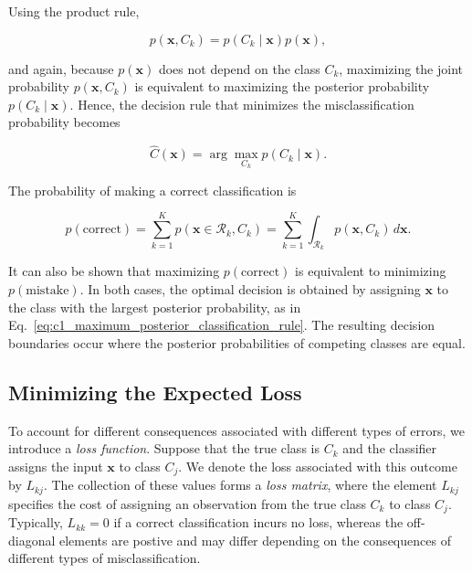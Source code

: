 \documentclass[10pt,twocolumn]{memoir}
\begin{document}
Using the product rule,

\begin{equation}
    p(\mathbf{x},C_k) = p(C_k\mid\mathbf{x})p(\mathbf{x}),
\end{equation}

and again, because $p(\mathbf{x})$ does not depend on the class $C_k$, maximizing the joint probability $p(\mathbf{x},C_k)$ is equivalent to maximizing the posterior probability $p(C_k\mid\mathbf{x})$. Hence, the decision rule that minimizes the misclassification probability becomes

\begin{equation}
    \hat{C}(\mathbf{x}) = \arg\max_{C_k} p(C_k\mid\mathbf{x}).
\label{eq:c1_maximum_posterior_classification_rule}
\end{equation}

The probability of making a correct classification is

\begin{equation}
    p(\mathrm{correct}) = \sum_{k=1}^{K}p(\mathbf{x}\in\mathcal{R}_k,C_k) = \sum_{k=1}^{K}\int_{\mathcal{R}_k}p(\mathbf{x},C_k)\,d\mathbf{x}.
\end{equation}

It can also be shown that maximizing $p(\mathrm{correct})$ is equivalent to minimizing $p(\mathrm{mistake})$. In both cases, the optimal decision is obtained by assigning $\mathbf{x}$ to the class with the largest posterior probability, as in Eq.~\ref{eq:c1_maximum_posterior_classification_rule}. The resulting decision boundaries occur where the posterior probabilities of competing classes are equal.

\subsection{Minimizing the Expected Loss}

To account for different consequences associated with different types of errors, we introduce a \textit{loss function}. Suppose that the true class is $C_k$ and the classifier assigns the input $\mathbf{x}$ to class $C_j$. We denote the loss associated with this outcome by $L_{kj}$. The collection of these values forms a \textit{loss matrix}, where the element $L_{kj}$ specifies the cost of assigning an observation from the true class $C_k$ to class $C_j$. Typically, $L_{kk}=0$ if a correct classification incurs no loss, whereas the off-diagonal elements are postive and may differ depending on the consequences of different types of misclassification.
\end{document}
